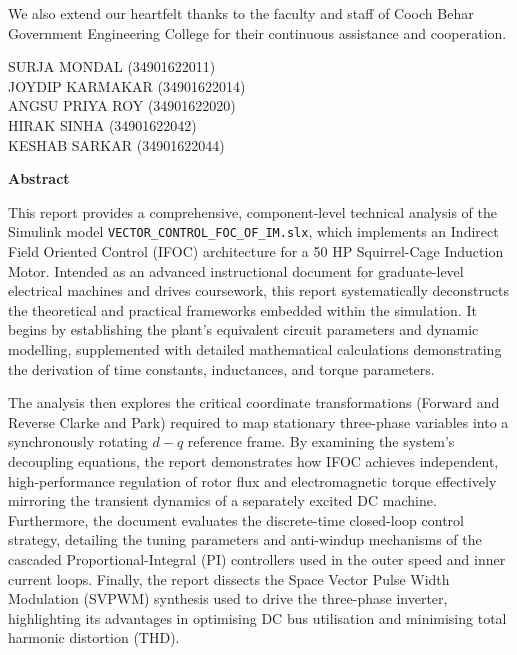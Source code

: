 \documentclass[12pt,a4paper]{report}
\begin{document}
We also extend our heartfelt thanks to the faculty and staff of Cooch Behar Government Engineering College for their continuous assistance and cooperation.

\vspace{2cm}
\begin{flushright}
SURJA MONDAL (34901622011)\\
JOYDIP KARMAKAR (34901622014)\\
ANGSU PRIYA ROY (34901622020)\\
HIRAK SINHA (34901622042)\\
KESHAB SARKAR (34901622044)
\end{flushright}

\newpage
\tableofcontents
\newpage
\listoffigures
\newpage
\listoftables

\newpage
\begin{center}
{\Large \bfseries Abstract\par}
\end{center}
\vspace{1cm}
This report provides a comprehensive, component-level technical analysis of the Simulink model \texttt{VECTOR\_CONTROL\_FOC\_OF\_IM.slx}, which implements an Indirect Field Oriented Control (IFOC) architecture for a 50 HP Squirrel-Cage Induction Motor. Intended as an advanced instructional document for graduate-level electrical machines and drives coursework, this report systematically deconstructs the theoretical and practical frameworks embedded within the simulation. It begins by establishing the plant's equivalent circuit parameters and dynamic modelling, supplemented with detailed mathematical calculations demonstrating the derivation of time constants, inductances, and torque parameters. 

The analysis then explores the critical coordinate transformations (Forward and Reverse Clarke and Park) required to map stationary three-phase variables into a synchronously rotating $d-q$ reference frame. By examining the system's decoupling equations, the report demonstrates how IFOC achieves independent, high-performance regulation of rotor flux and electromagnetic torque effectively mirroring the transient dynamics of a separately excited DC machine. Furthermore, the document evaluates the discrete-time closed-loop control strategy, detailing the tuning parameters and anti-windup mechanisms of the cascaded Proportional-Integral (PI) controllers used in the outer speed and inner current loops. Finally, the report dissects the Space Vector Pulse Width Modulation (SVPWM) synthesis used to drive the three-phase inverter, highlighting its advantages in optimising DC bus utilisation and minimising total harmonic distortion (THD).
\end{document}
